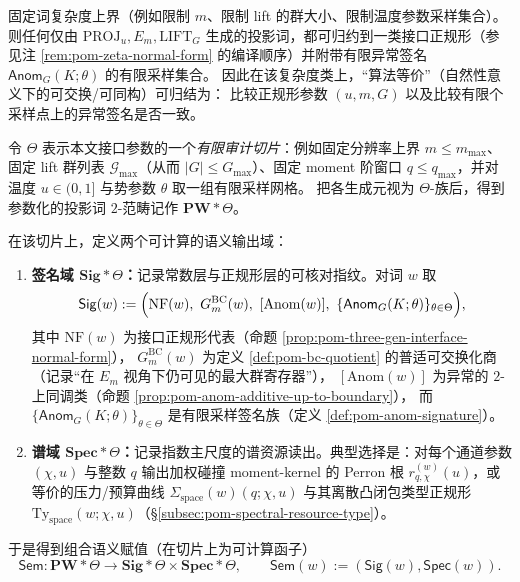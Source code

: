 \begin{corollary}\label{cor:pom-three-gen-normal-form-decidable}
固定词复杂度上界（例如限制 \(m\)、限制 lift 的群大小、限制温度参数采样集合）。
则任何仅由 \(\mathrm{PROJ}_u,E_m,\mathrm{LIFT}_G\) 生成的投影词，都可归约到一类接口正规形（参见注 \ref{rem:pom-zeta-normal-form} 的编译顺序）并附带有限异常签名
\(
\mathsf{Anom}_G(K;\theta)
\)
的有限采样集合。
因此在该复杂度类上，“算法等价”（自然性意义下的可交换/可同构）可归结为：
比较正规形参数 \((u,m,G)\) 以及比较有限个采样点上的异常签名是否一致。
\end{corollary}

\begin{definition}\label{def:pom-conservative-sem-functor}
令 \(\Theta\) 表示本文接口参数的一个\emph{有限审计切片}：例如固定分辨率上界 \(m\le m_{\max}\)、固定 lift 群列表 \(\mathcal{G}_{\max}\)（从而 \(|G|\le G_{\max}\)）、固定 moment 阶窗口 \(q\le q_{\max}\)，并对温度 \(u\in(0,1]\) 与势参数 \(\theta\) 取一组有限采样网格。
把各生成元视为 \(\Theta\)-族后，得到参数化的投影词 \(2\)-范畴记作 \(\mathbf{PW}*\Theta\)。
\par
在该切片上，定义两个可计算的语义输出域：
\begin{enumerate}
  \item \textbf{签名域 \(\mathbf{Sig}*\Theta\)：}记录常数层与正规形层的可核对指纹。对词 \(w\) 取
  \[
  \mathsf{Sig}(w):=\Bigl(\mathrm{NF}(w),\ G^{\mathrm{BC}}_m(w),\ [\mathrm{Anom}(w)],\ \{\mathsf{Anom}_{G}(K;\theta)\}_{\theta\in\Theta}\Bigr),
  \]
  其中 \(\mathrm{NF}(w)\) 为接口正规形代表（命题 \ref{prop:pom-three-gen-interface-normal-form}），
  \(G^{\mathrm{BC}}_m(w)\) 为定义 \ref{def:pom-bc-quotient} 的普适可交换化商（记录“在 \(E_m\) 视角下仍可见的最大群寄存器”），
  \([\mathrm{Anom}(w)]\) 为异常的 \(2\)-上同调类（命题 \ref{prop:pom-anom-additive-up-to-boundary}），
  而 \(\{\mathsf{Anom}_{G}(K;\theta)\}_{\theta\in\Theta}\) 是有限采样签名族（定义 \ref{def:pom-anom-signature}）。
  \item \textbf{谱域 \(\mathbf{Spec}*\Theta\)：}记录指数主尺度的谱资源读出。典型选择是：对每个通道参数 \((\chi,u)\) 与整数 \(q\) 输出加权碰撞 moment-kernel 的 Perron 根
  \(r^{(w)}_{q,\chi}(u)\)，或等价的压力/预算曲线 \(\Sigma_{\mathrm{space}}(w)(q;\chi,u)\) 与其离散凸闭包类型正规形 \(\mathrm{Ty}_{\mathrm{space}}(w;\chi,u)\)（\S\ref{subsec:pom-spectral-resource-type}）。
\end{enumerate}
于是得到组合语义赋值（在切片上为可计算函子）
\[
\boxed{\;
\mathsf{Sem}:\mathbf{PW}*\Theta\longrightarrow \mathbf{Sig}*\Theta\times \mathbf{Spec}*\Theta,\qquad
\mathsf{Sem}(w):=(\mathsf{Sig}(w),\mathsf{Spec}(w)).\;}
\]
\end{definition}


